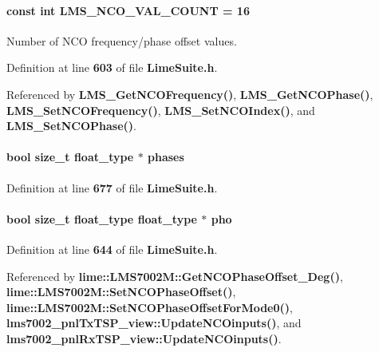 \paragraph[{L\+M\+S\+\_\+\+N\+C\+O\+\_\+\+V\+A\+L\+\_\+\+C\+O\+U\+NT}]{\setlength{\rightskip}{0pt plus 5cm}const {\bf int} L\+M\+S\+\_\+\+N\+C\+O\+\_\+\+V\+A\+L\+\_\+\+C\+O\+U\+NT = 16\hspace{0.3cm}{\ttfamily [static]}}\label{group__FN__ADVANCED_ga331504c4d15acccb359a9254601487b6}


Number of N\+CO frequency/phase offset values. 



Definition at line {\bf 603} of file {\bf Lime\+Suite.\+h}.



Referenced by {\bf L\+M\+S\+\_\+\+Get\+N\+C\+O\+Frequency()}, {\bf L\+M\+S\+\_\+\+Get\+N\+C\+O\+Phase()}, {\bf L\+M\+S\+\_\+\+Set\+N\+C\+O\+Frequency()}, {\bf L\+M\+S\+\_\+\+Set\+N\+C\+O\+Index()}, and {\bf L\+M\+S\+\_\+\+Set\+N\+C\+O\+Phase()}.

\paragraph[{phases}]{\setlength{\rightskip}{0pt plus 5cm}bool size\+\_\+t {\bf float\+\_\+type} $\ast$ phases}\label{group__FN__ADVANCED_ga7063a3c750acb78340bfe9352c26276e}


Definition at line {\bf 677} of file {\bf Lime\+Suite.\+h}.

\paragraph[{pho}]{\setlength{\rightskip}{0pt plus 5cm}bool size\+\_\+t {\bf float\+\_\+type} {\bf float\+\_\+type} $\ast$ pho}\label{group__FN__ADVANCED_gada94a93222605c574a9197b8acfe35b1}


Definition at line {\bf 644} of file {\bf Lime\+Suite.\+h}.



Referenced by {\bf lime\+::\+L\+M\+S7002\+M\+::\+Get\+N\+C\+O\+Phase\+Offset\+\_\+\+Deg()}, {\bf lime\+::\+L\+M\+S7002\+M\+::\+Set\+N\+C\+O\+Phase\+Offset()}, {\bf lime\+::\+L\+M\+S7002\+M\+::\+Set\+N\+C\+O\+Phase\+Offset\+For\+Mode0()}, {\bf lms7002\+\_\+pnl\+Tx\+T\+S\+P\+\_\+view\+::\+Update\+N\+C\+Oinputs()}, and {\bf lms7002\+\_\+pnl\+Rx\+T\+S\+P\+\_\+view\+::\+Update\+N\+C\+Oinputs()}.

